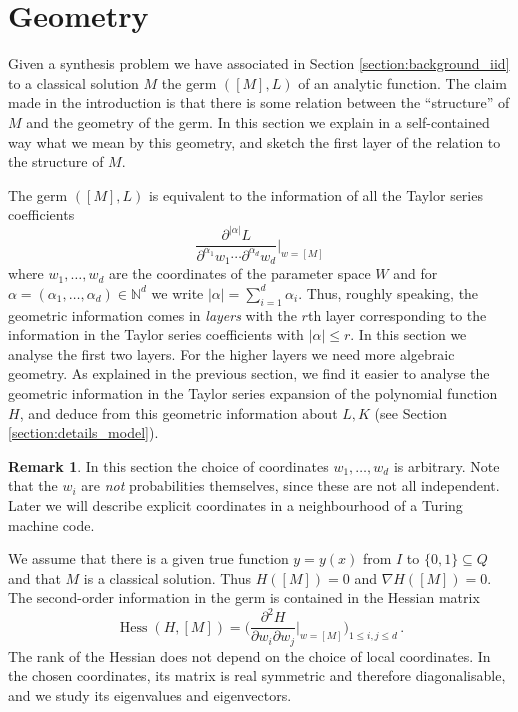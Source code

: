 \documentclass[english,letter paper,12pt,reqno]{article}
\theoremstyle{definition}
\newtheorem{remark}[theorem]{Remark}
\begin{document}
\section{Geometry}\label{section:geometry}

Given a synthesis problem we have associated in Section \ref{section:background_iid} to a classical solution $M$ the germ $([M], L)$ of an analytic function. The claim made in the introduction is that there is some relation between the ``structure'' of $M$ and the geometry of the germ. In this section we explain in a self-contained way what we mean by this geometry, and sketch the first layer of the relation to the structure of $M$.

The germ $([M], L)$ is equivalent to the information of all the Taylor series coefficients
\begin{equation}
\frac{\partial^{|\alpha|} L}{ \partial^{\alpha_1} w_1 \cdots \partial^{\alpha_d} w_d}\Bigr|_{w = [M]}
\end{equation}
where $w_1,\ldots,w_d$ are the coordinates of the parameter space $W$ and for $\alpha = (\alpha_1,\ldots,\alpha_d) \in \mathbb{N}^d$ we write $|\alpha| = \sum_{i=1}^d \alpha_i$. Thus, roughly speaking, the geometric information comes in \emph{layers} with the $r$th layer corresponding to the information in the Taylor series coefficients with $|\alpha| \le r$. In this section we analyse the first two layers. For the higher layers we need more algebraic geometry. As explained in the previous section, we find it easier to analyse the geometric information in the Taylor series expansion of the polynomial function $H$, and deduce from this geometric information about $L, K$ (see Section \ref{section:details_model}).

\begin{remark}\label{remark:coord_arb} In this section the choice of coordinates $w_1,\ldots,w_d$ is arbitrary. Note that the $w_i$ are \emph{not} probabilities themselves, since these are not all independent. Later we will describe explicit coordinates in a neighbourhood of a Turing machine code.
\end{remark}

We assume that there is a given true function $y = y(x)$ from $I$ to $\{ 0,1 \} \subseteq Q$ and that $M$ is a classical solution. Thus $H([M]) = 0$ and $\nabla H([M]) = 0$. The second-order information in the germ is contained in the Hessian matrix
\begin{equation}
\operatorname{Hess}(H, [M]) = \Bigg( \frac{\partial^2 H}{\partial w_i \partial w_j}\Bigr|_{w = [M]} \Bigg)_{1 \le i, j \le d}\,.
\end{equation}
The rank of the Hessian does not depend on the choice of local coordinates. In the chosen coordinates, its matrix is real symmetric and therefore diagonalisable, and we study its eigenvalues and eigenvectors.
\end{document}
